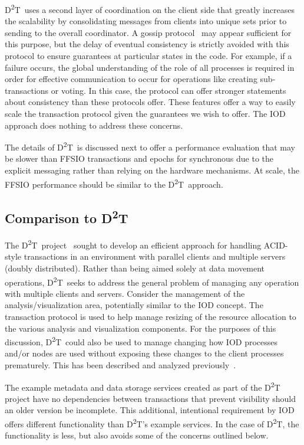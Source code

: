 \documentclass[conference]{IEEEtran}
\newcommand{\DDT}{D\textsuperscript{2}T~}
\newcommand{\DDTns}{D\textsuperscript{2}T}
\begin{document}
\DDT uses a second layer of coordination on the client side that greatly
increases the scalability by consolidating messages from clients into unique
sets prior to sending to the overall coordinator. A gossip
protocol~\cite{ganesh:2003:gossip-protocols} may appear sufficient for this
purpose, but the delay of eventual consistency is strictly avoided with this
protocol to ensure guarantees at particular states in the code. For example, if
a failure occurs, the global understanding of the role of all processes is
required in order for effective communication to occur for operations like
creating sub-transactions or voting. In this case, the protocol can offer
stronger statements about consistency than these protocols offer.  These
features offer a way to easily scale the transaction protocol given the
guarantees we wish to offer. The IOD approach does nothing to address these
concerns.

The details of \DDT is discussed next to offer a performance evaluation that
may be slower than FFSIO transactions and epochs for synchronous due to the
explicit messaging rather than relying on the hardware mechanisms. At scale,
the FFSIO performance should be similar to the \DDT approach.

\subsection{Comparison to \DDTns}
The \DDT project~\cite{lofstead:2012:txn} sought to develop an efficient
approach for handling ACID-style transactions in an environment with parallel
clients and multiple servers (doubly distributed). Rather than being aimed
solely at data movement operations, \DDT seeks to address the general problem
of managing any operation with multiple clients and servers.  Consider the
management of the analysis/visualization area, potentially similar to the IOD
concept. The transaction protocol is used to help manage resizing of the
resource allocation to the various analysis and visualization components.  For
the purposes of this discussion, \DDT could also be used to manage changing how
IOD processes and/or nodes are used without exposing these changes to the
client processes prematurely.  This has been described and analyzed
previously~\cite{dayal:2013:io-containers}.

The example metadata and data storage services created as part of the \DDT
project have no dependencies between transactions that prevent visibility
should an older version be incomplete. This additional, intentional requirement
by IOD offers different functionality than \DDTns's example services. In the
case of \DDTns, the functionality is less, but also avoids some of the concerns
outlined below.
\end{document}

